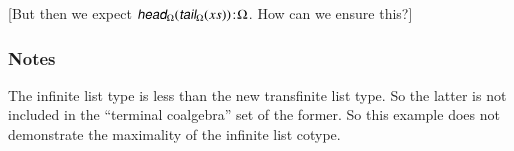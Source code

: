 [But then we expect \(\tj{\xcohead(\xcotail(\seq{x}))}{\Omega}\). How can we ensure this?]

\subsubsection{Notes}

The infinite list type is less than the new transfinite list type. So
the latter is not included in the ``terminal coalgebra'' set of the
former. So this example does not demonstrate the maximality of the
infinite list cotype.

